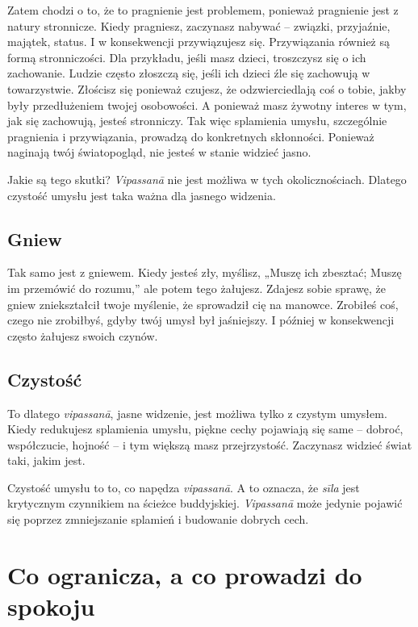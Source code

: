 \documentclass[12pt,openany]{book}
\begin{document}
Zatem chodzi o to, że to pragnienie jest problemem, ponieważ pragnienie jest z natury stronnicze. Kiedy pragniesz, zaczynasz nabywać – związki, przyjaźnie, majątek, status. I w konsekwencji przywiązujesz się. Przywiązania również są formą stronniczości. Dla przykładu, jeśli masz dzieci, troszczysz się o ich zachowanie. Ludzie często złoszczą się, jeśli ich dzieci źle się zachowują w towarzystwie. Złościsz się ponieważ czujesz, że odzwierciedlają coś o tobie, jakby były przedłużeniem twojej osobowości. A ponieważ masz żywotny interes w tym, jak się zachowują, jesteś stronniczy. Tak więc splamienia umysłu, szczególnie pragnienia i przywiązania, prowadzą do konkretnych skłonności. Ponieważ naginają twój światopogląd, nie jesteś w stanie widzieć jasno.

Jakie są tego skutki? \textit{Vipassanā} nie jest możliwa w tych okolicznościach. Dlatego czystość umysłu jest taka ważna dla jasnego widzenia.

\section*{Gniew}

Tak samo jest z gniewem. Kiedy jesteś zły, myślisz, „Muszę ich zbesztać; Muszę im przemówić do rozumu,” ale potem tego żałujesz. Zdajesz sobie sprawę, że gniew zniekształcił twoje myślenie, że sprowadził cię na manowce. Zrobiłeś coś, czego nie zrobiłbyś, gdyby twój umysł był jaśniejszy. I później w konsekwencji często żałujesz swoich czynów.

\section*{Czystość}

To dlatego \textit{vipassanā}, jasne widzenie, jest możliwa tylko z czystym umysłem. Kiedy redukujesz splamienia umysłu, piękne cechy pojawiają się same – dobroć, współczucie, hojność – i tym większą masz przejrzystość. Zaczynasz widzieć świat taki, jakim jest.

Czystość umysłu to to, co napędza \textit{vipassanā}. A to oznacza, że  \textit{sīla} jest krytycznym czynnikiem na ścieżce buddyjskiej. \textit{Vipassanā} może jedynie pojawić się poprzez zmniejszanie splamień i budowanie dobrych cech.

\chapter*{Co ogranicza, a co prowadzi do spokoju}
\end{document}
